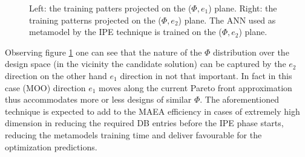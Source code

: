 \begin{figure}[h!]
\begin{minipage}[b]{0.5\linewidth}
 \centering
\end{minipage}
\begin{minipage}[b]{0.5\linewidth}
 \centering
\end{minipage}
\caption{Left: the training patters projected on the ($\Phi,e_1$) plane. Right: the training patterns projected on the ($\Phi,e_2$) plane. The ANN used as metamodel by the IPE technique is trained on the ($\Phi,e_2$) plane.} 
\label{1dann}
\end{figure}

Observing figure \ref{1dann} one can see that the nature of the $\Phi$ distribution over the design space (in the vicinity the candidate solution) can be captured by the $e_2$ direction on the other hand $e_1$ direction in not that important. In fact in this case (MOO) direction $e_1$ moves along the current Pareto front approximation thus accommodates more or less designs of similar $\Phi$. The aforementioned technique is expected to add to the MAEA efficiency in cases of extremely high dimension in reducing the required DB entries before the IPE phase starts, reducing the metamodels training time and deliver favourable for the optimization predictions.     

